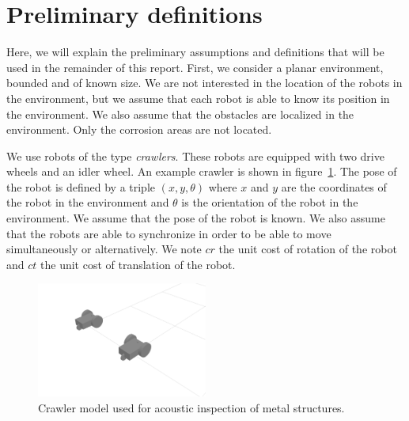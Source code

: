 \section{Preliminary definitions}\label{sec:definitions}

Here, we will explain the preliminary assumptions and definitions that will be used in the remainder of this report.
First, we consider a planar environment, bounded and of known size.
We are not interested in the location of the robots in the environment, but we assume that each robot is able to know its position in the environment.
We also assume that the obstacles are localized in the environment.
Only the corrosion areas are not located.

We use robots of the type \textit{crawlers}. These robots are equipped with two drive wheels and an idler wheel.
An example crawler is shown in figure~\ref{fig:crawler}.
The pose of the robot is defined by a triple $(x, y, \theta)$ where $x$ and $y$ are the coordinates of the robot in the environment and $\theta$ is the orientation of the robot in the environment.
We assume that the pose of the robot is known.
We also assume that the robots are able to synchronize in order to be able to move simultaneously or alternatively.
We note $cr$ the unit cost of rotation of the robot and $ct$ the unit cost of translation of the robot.

\begin{figure}[h!]
	\centering
	\includegraphics[width=0.5\textwidth]{graphics/crawlers.png}
	\caption{Crawler model used for acoustic inspection of metal structures.}
	\label{fig:crawler}
\end{figure}

